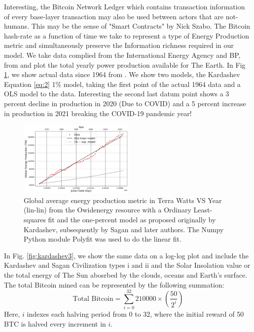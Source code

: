 \documentclass[final,5p,times,twocolumn,authoryear]{elsarticle}
\begin{document}
Interesting, the Bitcoin Network Ledger which contains transaction information of every base-layer transaction may also be used between actors that are not-humans. This may be the sense of "Smart Contracts" by Nick Szabo. The Bitcoin hash-rate as a function of time we take to represent a type of Energy Production metric and simultaneously preserve the Information richness required in our model. We take data complied from the International Energy Agency and BP, from \cite{owidenergy} and plot the total yearly power production available for The Earth. In Fig \ref{fig:kardashev1}, we show actual data since 1964 from \cite{owidenergy}. We show two models, the Kardashev Equation \ref{eq:2} 1\% model, taking the first point of the actual 1964 data and a OLS model to the data. Interesting the second last datum point shows a 3 percent decline in production in 2020 (Due to COVID) and a 5 percent increase in production in 2021 breaking the COVID-19 pandemic year!
\begin{figure}
    \centering
    \includegraphics[width=0.5\textwidth]{figs/fig1_kar2ff.jpg}
    \caption{Global average energy production metric in Terra Watts VS Year (lin-lin) from the Owidenergy resource with a Ordinary Least-squares fit and the one-percent model as proposed originally by Kardashev, subsequently by Sagan and later authors. The Numpy Python module Polyfit was used to do the linear fit.}
    \label{fig:kardashev1}

\end{figure}

In Fig. \ref{fig:kardashev3}, we show the same data on a log-log plot and include the Kardashev and Sagan Civilization types i and ii and the Solar Insolation value or the total energy of The Sun abosrbed by the clouds, oceans and Earth's surface. %
The total Bitcoin mined can be represented by the following summation:
\[
\textrm{Total Bitcoin} = \sum_{i=0}^{32} 210000 \times \left(\frac{50}{2^i}\right)
\]
Here, \( i \) indexes each halving period from 0 to 32, where the initial reward of 50 BTC is halved every increment in \( i \).
\end{document}
